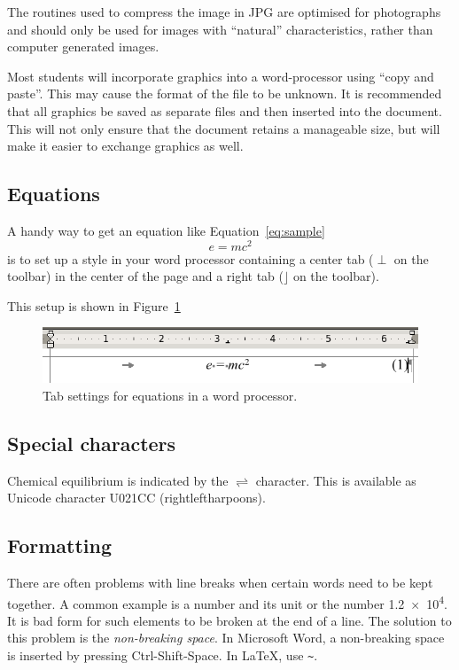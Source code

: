 \documentclass[a5paper, 10pt]{article}
\begin{document}
The routines used to compress the image in JPG are optimised for
photographs and should only be used for images with ``natural''
characteristics, rather than computer generated images.

Most students will incorporate graphics into a word-processor using
``copy and paste''.  This may cause the format of the file to be
unknown.  It is recommended that all graphics be saved as separate
files and then inserted into the document.  This will not only ensure
that the document retains a manageable size, but will make it easier to
exchange graphics as well.

\subsection{Equations}
\label{sec:tips-equations}
A handy way to get an equation like Equation~\ref{eq:sample}
\begin{equation}
  \label{eq:sample}
  e=mc^2
\end{equation}
is to set up a style in your word processor containing a center tab
($\perp$ on the toolbar) in the center of the page and a right tab
($\rfloor$ on the toolbar).

This setup is shown in Figure~\ref{fig:tabsettings}

\begin{figure}[h]
  \centering
  \includegraphics[width=\textwidth]{graph/eqtabsettings.png}
  \caption{Tab settings for equations in a word processor.}
  \label{fig:tabsettings}
\end{figure}

\subsection{Special characters}
Chemical equilibrium is indicated by the $\rightleftharpoons$
character.  This is available as Unicode character U021CC
(rightleftharpoons).

\subsection{Formatting}
\label{sec:tips-formatting}
There are often problems with line breaks when certain words need to
be kept together.  A common example is a number and its unit or the
number \num{1.2e4}.  It is bad form for such elements to be broken at
the end of a line.  The solution to this problem is the
\emph{non-breaking space}.  In Microsoft Word, a non-breaking space is
inserted by pressing Ctrl-Shift-Space.  In \LaTeX, use \verb|~|.
\end{document}
